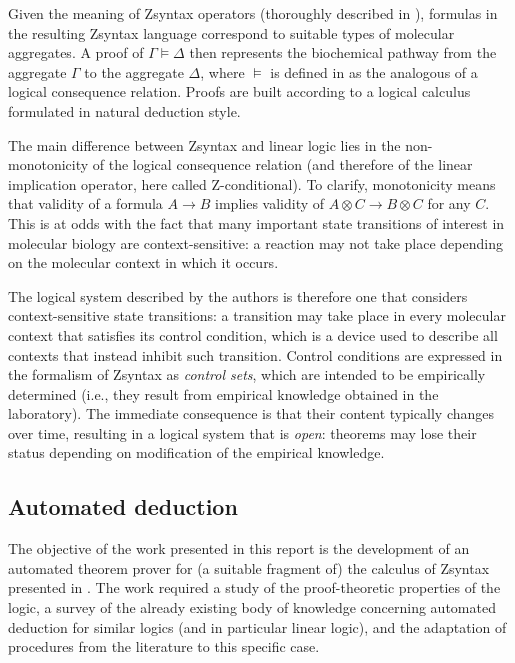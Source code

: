Given the meaning of Zsyntax operators (thoroughly described in
\cite{adding-logic}), formulas in the resulting Zsyntax language correspond
to suitable types of molecular aggregates. A proof of $\Gamma \models \Delta$
then represents the biochemical pathway from the aggregate $\Gamma$ to the
aggregate $\Delta$, where $\models$ is defined in \cite{adding-logic} as the
analogous of a logical consequence relation. Proofs are built according to a
logical calculus formulated in natural deduction style.

The main difference between Zsyntax and linear logic lies in the
non-monotonicity of the logical consequence relation (and therefore of the
linear implication operator, here called Z-conditional). To clarify,
monotonicity means that validity of a formula $A \rightarrow B$ implies validity
of $A \otimes C \rightarrow B \otimes C$ for any $C$. This is at odds with the
fact that many important state transitions of interest in molecular biology are
context-sensitive: a reaction may not take place depending on the molecular
context in which it occurs.

The logical system described by the authors is therefore one that considers
context-sensitive state transitions: a transition may take place in every
molecular context that satisfies its control condition, which is a device used
to describe all contexts that instead inhibit such transition.
Control conditions are expressed in the formalism of Zsyntax as
\emph{control sets}, which are intended to be empirically determined (i.e., they
result from empirical knowledge obtained in the laboratory). The immediate
consequence is that their content typically changes over time, resulting in a
logical system that is \emph{open}: theorems may lose their status depending on
modification of the empirical knowledge.

\subsection{Automated deduction}

The objective of the work presented in this report is the development of an
automated theorem prover for (a suitable fragment of) the calculus of Zsyntax
presented in \cite{adding-logic}. The work required a study of the
proof-theoretic properties of the logic, a survey of the already existing body
of knowledge concerning automated deduction for similar logics (and in
particular linear logic), and the adaptation of procedures from the literature
to this specific case.

